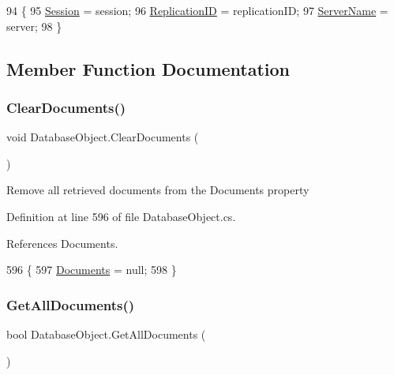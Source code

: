 \begin{DoxyCode}
94                                                                                       \{
95         \mbox{\hyperlink{class_database_object_aa8484162b7d2a7c4c9426bca13c64c07}{Session}} = session;
96         \mbox{\hyperlink{class_database_object_aaa091ee1a9a86d2d10fe2381ee2d1f4c}{ReplicationID}} = replicationID;
97         \mbox{\hyperlink{class_database_object_ad6bfcd30152f7a115ac5a1c7fbfa9fcb}{ServerName}} = server;
98     \}
\end{DoxyCode}


\subsection{Member Function Documentation}
\mbox{\label{class_database_object_af9c4789dea0a14e5a2f914758d3bc54e}} 
\subsubsection{\texorpdfstring{Clear\+Documents()}{ClearDocuments()}}
{\footnotesize\ttfamily void Database\+Object.\+Clear\+Documents (\begin{DoxyParamCaption}{ }\end{DoxyParamCaption})}



Remove all retrieved documents from the \textquotesingle{}Documents\textquotesingle{} property 



Definition at line 596 of file Database\+Object.\+cs.



References Documents.


\begin{DoxyCode}
596                                  \{
597         \mbox{\hyperlink{class_database_object_afaf1159aa427c5bcce01c4b8c6f34514}{Documents}} = null;
598     \}
\end{DoxyCode}
\mbox{\label{class_database_object_ad3010e55b2e75d0863e168fed1e279c5}} 
\subsubsection{\texorpdfstring{Get\+All\+Documents()}{GetAllDocuments()}}
{\footnotesize\ttfamily bool Database\+Object.\+Get\+All\+Documents (\begin{DoxyParamCaption}{ }\end{DoxyParamCaption})}



